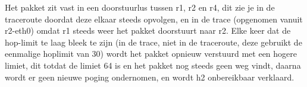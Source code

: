 Het pakket zit vast in een doorstuurlus tussen r1, r2 en r4, dit zie je in de traceroute doordat deze elkaar steeds opvolgen, en in de trace (opgenomen vanuit r2-eth0) omdat r1 steeds weer het pakket doorstuurt naar r2. Elke keer dat de hop-limit te laag bleek te zijn (in de trace, niet in de traceroute, deze gebruikt de eenmalige hoplimit van 30) wordt het pakket opnieuw verstuurd met een hogere limiet, dit totdat de limiet 64 is en het pakket nog steeds geen weg vindt, daarna wordt er geen nieuwe poging ondernomen, en wordt h2 onbereikbaar verklaard.